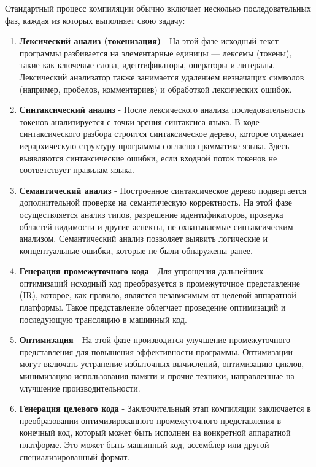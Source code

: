 \documentclass[14pt, russian]{scrartcl}
\begin{document}
Стандартный процесс компиляции обычно включает несколько последовательных фаз, каждая из которых выполняет свою задачу:

\begin{enumerate}
	\item \textbf{Лексический анализ (токенизация)} - На этой фазе исходный текст программы разбивается на
	элементарные единицы — лексемы (токены), такие как ключевые слова, идентификаторы, операторы и литералы.
	Лексический анализатор также занимается удалением незначащих символов (например, пробелов, комментариев)
	и обработкой лексических ошибок.

	\item \textbf{Синтаксический анализ} - После лексического анализа последовательность токенов анализируется
	с точки зрения синтаксиса языка. В ходе синтаксического разбора строится синтаксическое дерево,
	которое отражает иерархическую структуру программы согласно грамматике языка. Здесь выявляются синтаксические
	ошибки, если входной поток токенов не соответствует правилам языка.

	\item \textbf{Семантический анализ} - Построенное синтаксическое дерево подвергается дополнительной проверке
	на семантическую корректность. На этой фазе осуществляется анализ типов, разрешение идентификаторов,
	проверка областей видимости и другие аспекты, не охватываемые синтаксическим анализом. Семантический анализ
	позволяет выявить логические и концептуальные ошибки, которые не были обнаружены ранее.

	\item \textbf{Генерация промежуточного кода} - Для упрощения дальнейших оптимизаций исходный код преобразуется
	в промежуточное представление (IR), которое, как правило, является независимым от целевой аппаратной платформы.
	Такое представление облегчает проведение оптимизаций и последующую трансляцию в машинный код.

	\item \textbf{Оптимизация} - На этой фазе производится улучшение промежуточного представления для повышения
	эффективности программы. Оптимизации могут включать устранение избыточных вычислений, оптимизацию циклов,
	минимизацию использования памяти и прочие техники, направленные на улучшение производительности.

	\item \textbf{Генерация целевого кода} - Заключительный этап компиляции заключается в преобразовании
	оптимизированного промежуточного представления в конечный код, который может быть исполнен на конкретной
	аппаратной платформе. Это может быть машинный код, ассемблер или другой специализированный формат.
\end{enumerate}
\end{document}
